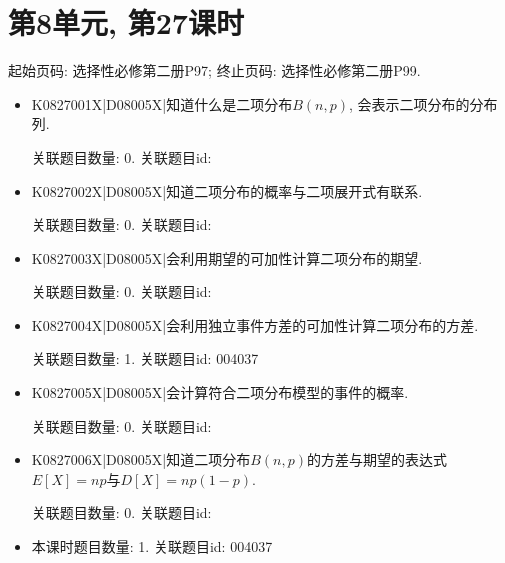 \section*{第8单元, 第27课时}
起始页码: 选择性必修第二册P97; 终止页码: 选择性必修第二册P99.
\begin{itemize}
\item K0827001X|D08005X|知道什么是二项分布$B(n,p)$, 会表示二项分布的分布列.

关联题目数量: 0. 关联题目id: 

\item K0827002X|D08005X|知道二项分布的概率与二项展开式有联系.

关联题目数量: 0. 关联题目id: 

\item K0827003X|D08005X|会利用期望的可加性计算二项分布的期望.

关联题目数量: 0. 关联题目id: 

\item K0827004X|D08005X|会利用独立事件方差的可加性计算二项分布的方差.

关联题目数量: 1. 关联题目id: 004037

\item K0827005X|D08005X|会计算符合二项分布模型的事件的概率.

关联题目数量: 0. 关联题目id: 

\item K0827006X|D08005X|知道二项分布$B(n,p)$的方差与期望的表达式$E[X]=np$与$D[X]=np(1-p)$.

关联题目数量: 0. 关联题目id: 

\item 本课时题目数量: 1. 关联题目id: 004037

\end{itemize}

